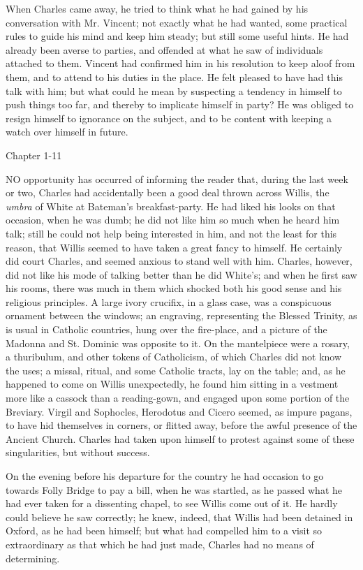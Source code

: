 When Charles came away, he tried to think what he had gained by his
conversation with Mr. Vincent; not exactly what he had wanted, some
practical rules to guide his mind and keep him steady; but still some
useful hints. He had already been averse to parties, and offended at
what he saw of individuals attached to them. Vincent had confirmed him
in his resolution to keep aloof from them, and to attend to his duties
in the place. He felt pleased to have had this talk with him; but what
could he mean by suspecting a tendency in himself to push things too
far, and thereby to implicate himself in party? He was obliged to
resign himself to ignorance on the subject, and to be content with
keeping a watch over himself in future.

Chapter 1-11


NO opportunity has occurred of informing
the reader that, during the last week or two, Charles had accidentally
been a good deal thrown across Willis, the \emph{umbra} of White at
Bateman's breakfast-party. He had liked his looks on that occasion,
when he was dumb; he did not like him so much when he heard him talk;
still he could not help being interested in him, and not the least for
this reason, that Willis seemed to have taken a great fancy to
himself. He certainly did court Charles, and seemed anxious to stand
well with him. Charles, however, did not like his mode of talking
better than he did White's; and when he first saw his rooms, there was
much in them which shocked both his good sense and his religious
principles. A large ivory crucifix, in a glass case, was a conspicuous
ornament between the windows; an engraving, representing the Blessed
Trinity, as is usual in Catholic countries, hung over the fire-place,
and a picture of the Madonna and St. Dominic was opposite to it. On
the mantelpiece were a rosary, a thuribulum, and other tokens of
Catholicism, of which Charles did not know the uses; a missal, ritual,
and some Catholic tracts, lay on the table; and, as he happened
to come on Willis unexpectedly, he found him sitting in a vestment
more like a cassock than a reading-gown, and engaged upon some portion
of the Breviary. Virgil and Sophocles, Herodotus and Cicero seemed, as
impure pagans, to have hid themselves in corners, or flitted away,
before the awful presence of the Ancient Church. Charles had taken
upon himself to protest against some of these singularities, but
without success.

On the evening before his departure for the country he had occasion
to go towards Folly Bridge to pay a bill, when he was startled, as he
passed what he had ever taken for a dissenting chapel, to see Willis
come out of it. He hardly could believe he saw correctly; he knew,
indeed, that Willis had been detained in Oxford, as he had been
himself; but what had compelled him to a visit so extraordinary as
that which he had just made, Charles had no means of determining.

